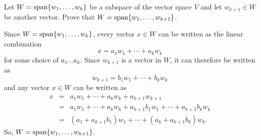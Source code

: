 \documentclass{ximera}
\begin{document}
\begin{exercise} \label{c5.2.9}
Let $W={\rm span}\{w_1,\ldots,w_k\}$ be a subspace of the vector
space $V$ and let $w_{k+1}\in W$ be another vector.  Prove that
$W={\rm span}\{w_1,\ldots,w_{k+1}\}$.

\begin{solution}

Since $W = {\rm span}\{w_1,\dots ,w_k\}$, every vector $x \in W$ can be
written as the linear combination
\[ x = a_1w_1 + \cdots + a_kw_k \]
for some choice of $a_1 \dots a_k$.  Since $w_{k + 1}$ is a vector in
$W$, it can therefore be written as
\[ w_{k + 1} = b_1w_1 + \cdots + b_kw_k \]
and any vector $x \in W$ can be written as
\[ \begin{array}{rcl}
x & = &
a_1w_1 + \cdots + a_kw_k + a_{k+1}w_{k+1} \\
& = & a_1w_1 + \cdots + a_kw_k + a_{k+1}b_1w_1 + \cdots + a_{k+1}b_kw_k
\\ & = & (a_1 + a_{k+1}b_1)w_1 + \cdots + (a_k + a_{k+1}b_k)w_k.
\end{array} \]
So, $W = {\rm span}\{w_1,\dots ,w_{k+1}\}$.

\end{solution}
\end{exercise}
\end{document}

